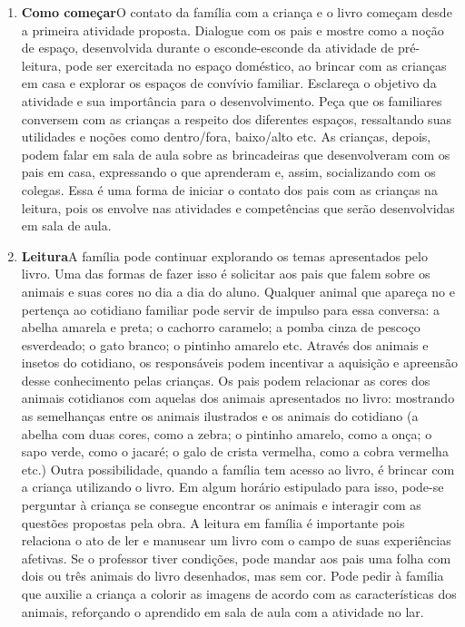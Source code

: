 \documentclass[11pt]{extarticle}
\begin{document}
\begin{enumerate}
\item \textbf{Como começar}\quad O contato da família com a criança e o livro começam desde a primeira atividade proposta.
Dialogue com os pais e mostre como a noção de espaço, desenvolvida durante o esconde-esconde da atividade de pré-leitura, pode ser exercitada no espaço doméstico, ao brincar com as crianças em casa e explorar os espaços de convívio familiar.
Esclareça o objetivo da atividade e sua importância para o desenvolvimento. 
Peça que os familiares conversem com as crianças a respeito dos diferentes espaços, ressaltando suas utilidades e noções como dentro/fora, baixo/alto etc.
As crianças, depois, podem falar em sala de aula sobre as brincadeiras que desenvolveram com os pais em casa, expressando o que aprenderam e, assim, socializando com os colegas.
Essa é uma forma de iniciar o contato dos pais com as crianças na leitura, pois os envolve nas atividades e competências que serão desenvolvidas em sala de aula.

\item \textbf{Leitura}\quad A família pode continuar 
explorando os temas apresentados pelo livro. Uma das formas de fazer isso é solicitar aos pais que falem sobre os animais e suas cores no dia a dia do aluno.
Qualquer animal que apareça no e pertença ao cotidiano familiar pode servir de impulso para essa conversa: a abelha amarela e preta; o cachorro caramelo; a pomba cinza de pescoço esverdeado; o gato branco; o pintinho amarelo etc.
Através dos animais e insetos do cotidiano, os responsáveis podem incentivar a aquisição e apreensão desse conhecimento pelas crianças.
Os pais podem relacionar as cores dos animais cotidianos com aquelas dos animais apresentados no livro: mostrando as semelhanças entre os animais ilustrados e os animais do cotidiano (a abelha com duas cores, como a zebra; o pintinho amarelo, como a onça; o sapo verde, como o jacaré; o galo de crista vermelha, como a cobra vermelha etc.)
Outra possibilidade, quando a família tem acesso ao livro, é brincar com a criança utilizando o livro. Em algum horário estipulado para isso, pode-se perguntar à criança se consegue encontrar os animais e interagir com as questões propostas pela obra.
A leitura em família é importante pois relaciona o ato de ler e manusear um livro com o campo de suas experiências afetivas.
Se o professor tiver condições, pode mandar aos pais uma folha com dois ou três animais do livro desenhados, mas sem cor. Pode pedir à família que auxilie a criança a colorir as imagens de acordo com as características dos animais, reforçando o aprendido em sala de aula com a atividade no lar.


\end{enumerate}
\end{document}
